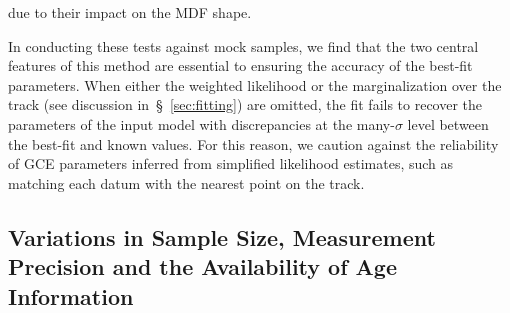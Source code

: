 \documentclass[ms.tex]{subfiles}
\begin{document}
due to their impact on the MDF shape.
\par
In conducting these tests against mock samples, we find that the two central
features of this method are essential to ensuring the accuracy of the best-fit
parameters.
When either the weighted likelihood or the marginalization over the track
(see discussion in~\S~\ref{sec:fitting}) are omitted, the fit fails to recover
the parameters of the input model with discrepancies at the many-$\sigma$ level
between the best-fit and known values.
For this reason, we caution against the reliability of GCE parameters inferred
from simplified likelihood estimates, such as matching each datum with the
nearest point on the track.

\subsection{Variations in Sample Size, Measurement Precision and the
Availability of Age Information}
\label{sec:mocks:variations}


\end{document}
